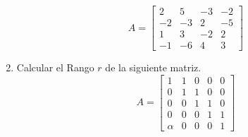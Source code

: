 \documentclass[12pt]{article}
\begin{document}
\begin{enumerate}
    $$
    A=\begin{bmatrix}
    2 & 5 & -3 & -2\\
    -2 & -3 & 2 & -5\\
    1 & 3 & -2 & 2\\
    -1 & -6 & 4 &  3
    \end{bmatrix}
    $$
    \item Calcular el Rango $r$ de la siguiente matriz.
    $$
    A=\begin{bmatrix}
    1 & 1 & 0 & 0 & 0\\
    0 & 1 & 1 & 0 & 0\\
    0 & 0 & 1 & 1 & 0\\
    0 & 0 & 0 & 1 & 1\\
    \alpha & 0 & 0 & 0 & 1    
    \end{bmatrix}    
    $$
\end{enumerate}
\end{document}
